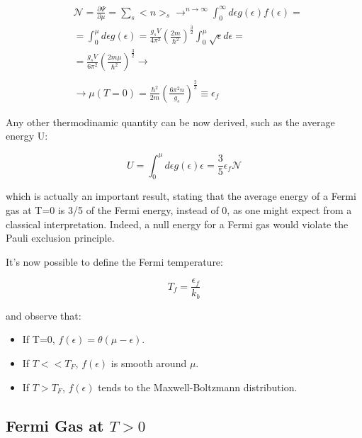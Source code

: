 \documentclass{article}
\begin{document}
\begin{equation}
    \begin{aligned}
         & \mathcal{N}=\frac{\partial\Psi}{\partial \mu}=\sum_s <n>_s\rightarrow^{n\rightarrow\infty} \int_{0}^{\infty} d\epsilon g(\epsilon)f(\epsilon)= \\
         & =\int_{0}^{\mu} d\epsilon g(\epsilon)=\frac{g_sV}{4\pi^2}\left(\frac{2m}{\hbar^2}\right)^{\frac{3}{2}}\int_{0}^{\mu}\sqrt{\epsilon}d\epsilon=  \\
         & = \frac{g_sV}{6\pi^2}\left(\frac{2m\mu}{\hbar^2}\right)^{\frac{3}{2}}\rightarrow                                                               \\                                                 \\
         & \rightarrow \mu(T=0)=\frac{\hbar^2}{2m}\left(\frac{6\pi^2n}{g_s}\right)^{\frac{2}{3}}\equiv \epsilon_f
    \end{aligned}
\end{equation}

Any other thermodinamic quantity can be now derived, such as the average energy U:

\begin{equation}
    U=\int_{0}^{\mu}d\epsilon g(\epsilon)\epsilon=\frac{3}{5}\epsilon_f\mathcal{N}
\end{equation}

which is actually an important result, stating that the average energy of a Fermi gas at T=0 is 3/5 of the Fermi energy, instead
of 0, as one might expect from a classical interpretation. Indeed, a null energy for a Fermi gas
would violate the Pauli exclusion principle.

It's now possible to define the Fermi temperature:

\begin{equation}
    T_f=\frac{\epsilon_f}{k_b}
\end{equation}

and observe that:

\begin{itemize}
    \item If T=0, $f(\epsilon)=\theta(\mu-\epsilon)$.
    \item If $T<<T_F$, $f(\epsilon)$ is smooth around $\mu$.
    \item If $T>T_F$, $f(\epsilon)$ tends to the Maxwell-Boltzmann distribution.
\end{itemize}

\subsection{Fermi Gas at $T>0$}
\end{document}
